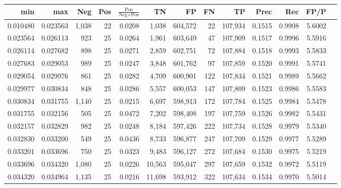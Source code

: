 \begin{tabular}{rrrrrrrrrrrrr}
\toprule
     min &      max &   Neg & Pos & $\frac{\text{Pos}}{\text{Neg}+\text{Pos}}$ &      TN &      FP &      FN &      TP &   Prec &    Rec &   FP/P \\
\midrule
0.010480 & 0.023563 & 1,038 &  22 &                                     0.0208 &   1,038 & 604,572 &      22 & 107,934 & 0.1515 & 0.9998 & 5.6002 \\
0.023564 & 0.026113 &   923 &  25 &                                     0.0264 &   1,961 & 603,649 &      47 & 107,909 & 0.1517 & 0.9996 & 5.5916 \\
0.026114 & 0.027682 &   898 &  25 &                                     0.0271 &   2,859 & 602,751 &      72 & 107,884 & 0.1518 & 0.9993 & 5.5833 \\
0.027683 & 0.029053 &   989 &  25 &                                     0.0247 &   3,848 & 601,762 &      97 & 107,859 & 0.1520 & 0.9991 & 5.5741 \\
0.029054 & 0.029976 &   861 &  25 &                                     0.0282 &   4,709 & 600,901 &     122 & 107,834 & 0.1521 & 0.9989 & 5.5662 \\
0.029977 & 0.030834 &   848 &  25 &                                     0.0286 &   5,557 & 600,053 &     147 & 107,809 & 0.1523 & 0.9986 & 5.5583 \\
0.030834 & 0.031755 & 1,140 &  25 &                                     0.0215 &   6,697 & 598,913 &     172 & 107,784 & 0.1525 & 0.9984 & 5.5478 \\
0.031755 & 0.032156 &   505 &  25 &                                     0.0472 &   7,202 & 598,408 &     197 & 107,759 & 0.1526 & 0.9982 & 5.5431 \\
0.032157 & 0.032829 &   982 &  25 &                                     0.0248 &   8,184 & 597,426 &     222 & 107,734 & 0.1528 & 0.9979 & 5.5340 \\
0.032830 & 0.033200 &   549 &  25 &                                     0.0436 &   8,733 & 596,877 &     247 & 107,709 & 0.1529 & 0.9977 & 5.5289 \\
0.033201 & 0.033696 &   750 &  25 &                                     0.0323 &   9,483 & 596,127 &     272 & 107,684 & 0.1530 & 0.9975 & 5.5219 \\
0.033696 & 0.034320 & 1,080 &  25 &                                     0.0226 &  10,563 & 595,047 &     297 & 107,659 & 0.1532 & 0.9972 & 5.5119 \\
0.034320 & 0.034964 & 1,135 &  25 &                                     0.0216 &  11,698 & 593,912 &     322 & 107,634 & 0.1534 & 0.9970 & 5.5014 \\

\end{tabular}

